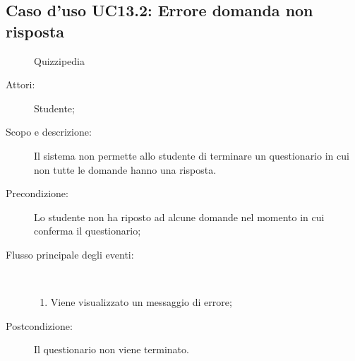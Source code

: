 \subsection{Caso d'uso UC13.2: Errore domanda non risposta}
	\begin{figure}[H]
		\centering
		\begin{resizedtikzpicture}{\textwidth}
		\begin{umlsystem}[x=0, fill=lightgray!20]{Quizzipedia}
		\end{umlsystem}
		\end{resizedtikzpicture}
		\caption{}
	\end{figure}
\begin{description}
\item[Attori:] Studente;
\item[Scopo e descrizione:] Il sistema non permette allo studente di terminare un questionario in cui non tutte le domande hanno una risposta.
      \item[Precondizione:] Lo studente non ha riposto ad alcune domande nel momento in cui conferma il questionario;

        \item[Flusso principale degli eventi:] \ 
 \begin{enumerate}
          \item Viene visualizzato un messaggio di errore;

      \end{enumerate}
    \item[Postcondizione:] Il questionario non viene terminato.
  \end{description}
\hypertarget{UC13.3}{}
